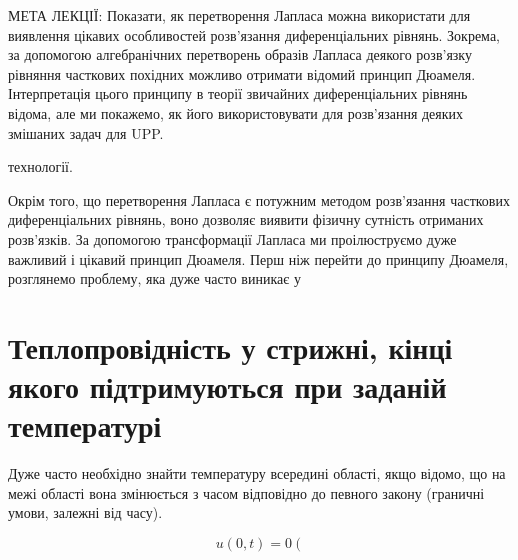 \documentclass[
  ukrainian,
]{article}
\begin{document}
МЕТА ЛЕКЦІЇ: Показати, як перетворення Лапласа можна використати для
виявлення цікавих особливостей розв'язання диференціальних рівнянь.
Зокрема, за допомогою алгебранічних перетворень образів Лапласа деякого
розв'язку рівняння часткових похідних можливо отримати відомий принцип
Дюамеля. Інтерпретація цього принципу в теорії звичайних диференціальних
рівнянь відома, але ми покажемо, як його використовувати для розв'язання
деяких змішаних задач для UPP.

технології.

Окрім того, що перетворення Лапласа є потужним методом розв'язання
часткових диференціальних рівнянь, воно дозволяє виявити фізичну
сутність отриманих розв'язків. За допомогою трансформації Лапласа ми
проілюструємо дуже важливий і цікавий принцип Дюамеля. Перш ніж перейти
до принципу Дюамеля, розглянемо проблему, яка дуже часто виникає у

\section{Теплопровідність у стрижні, кінці якого підтримуються при
заданій
температурі}\label{ux442ux435ux43fux43bux43eux43fux440ux43eux432ux456ux434ux43dux456ux441ux442ux44c-ux443-ux441ux442ux440ux438ux436ux43dux456-ux43aux456ux43dux446ux456-ux44fux43aux43eux433ux43e-ux43fux456ux434ux442ux440ux438ux43cux443ux44eux442ux44cux441ux44f-ux43fux440ux438-ux437ux430ux434ux430ux43dux456ux439-ux442ux435ux43cux43fux435ux440ux430ux442ux443ux440ux456}

Дуже часто необхідно знайти температуру всередині області, якщо відомо,
що на межі області вона змінюється з часом відповідно до певного закону
(граничні умови, залежні від часу).

\[
u(0,t)=0 \left(
\]

\[
\begin{aligned} \\ \\ \\ \\ \\ \\ \\ \\ \\ \\ \\ \\ \\ \\ \\ \\ \\ \\ \\ \end{aligned}
\]
\end{document}
